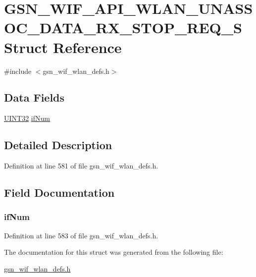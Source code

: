 \hypertarget{a00312}{
\section{GSN\_\-WIF\_\-API\_\-WLAN\_\-UNASSOC\_\-DATA\_\-RX\_\-STOP\_\-REQ\_\-S Struct Reference}
\label{a00312}
}


{\ttfamily \#include $<$gsn\_\-wif\_\-wlan\_\-defs.h$>$}

\subsection*{Data Fields}
\begin{DoxyCompactItemize}
\item 
\hyperlink{a00660_gae1e6edbbc26d6fbc71a90190d0266018}{UINT32} \hyperlink{a00312_ab582fd779b13f74e06e2491389a60aa0}{ifNum}
\end{DoxyCompactItemize}


\subsection{Detailed Description}


Definition at line 581 of file gsn\_\-wif\_\-wlan\_\-defs.h.



\subsection{Field Documentation}
\hypertarget{a00312_ab582fd779b13f74e06e2491389a60aa0}{
\subsubsection[{ifNum}]{ {\bf ifNum}}}
\label{a00312_ab582fd779b13f74e06e2491389a60aa0}


Definition at line 583 of file gsn\_\-wif\_\-wlan\_\-defs.h.



The documentation for this struct was generated from the following file:\begin{DoxyCompactItemize}
\item 
\hyperlink{a00613}{gsn\_\-wif\_\-wlan\_\-defs.h}\end{DoxyCompactItemize}
